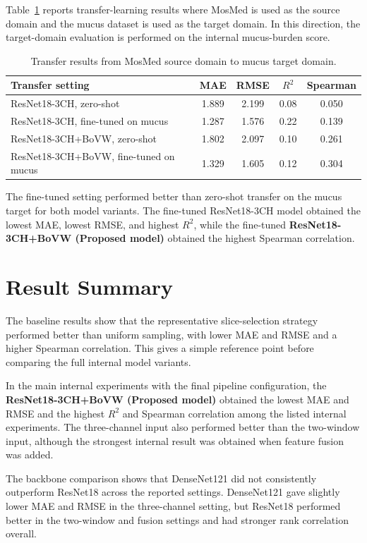 Table~\ref{tab:transfer_mucus_target} reports transfer-learning results where MosMed is used as the source domain and the mucus dataset is used as the target domain. In this direction, the target-domain evaluation is performed on the internal mucus-burden score.

\begin{table}[H]
\centering
\caption{Transfer results from MosMed source domain to mucus target domain.}
\label{tab:transfer_mucus_target}
\begin{tabular}{lcccc}
\toprule
Transfer setting & MAE & RMSE & \(R^2\) & Spearman \\
\midrule
ResNet18-3CH, zero-shot & 1.889 & 2.199 & 0.08 & 0.050 \\
ResNet18-3CH, fine-tuned on mucus & 1.287 & 1.576 & 0.22 & 0.139 \\
ResNet18-3CH+BoVW, zero-shot & 1.802 & 2.097 & 0.10 & 0.261 \\
ResNet18-3CH+BoVW, fine-tuned on mucus & 1.329 & 1.605 & 0.12 & 0.304 \\
\bottomrule
\end{tabular}
\end{table}

The fine-tuned setting performed better than zero-shot transfer on the mucus target for both model variants. The fine-tuned ResNet18-3CH model obtained the lowest MAE, lowest RMSE, and highest \(R^2\), while the fine-tuned \textbf{ResNet18-3CH+BoVW (Proposed model)} obtained the highest Spearman correlation.


\section{Result Summary}
\label{sec:result_summary}
The baseline results show that the representative slice-selection strategy performed better than uniform sampling, with lower MAE and RMSE and a higher Spearman correlation. This gives a simple reference point before comparing the full internal model variants.

In the main internal experiments with the final pipeline configuration, the \textbf{ResNet18-3CH+BoVW (Proposed model)} obtained the lowest MAE and RMSE and the highest \(R^2\) and Spearman correlation among the listed internal experiments. The three-channel input also performed better than the two-window input, although the strongest internal result was obtained when feature fusion was added.

The backbone comparison shows that DenseNet121 did not consistently outperform ResNet18 across the reported settings. DenseNet121 gave slightly lower MAE and RMSE in the three-channel setting, but ResNet18 performed better in the two-window and fusion settings and had stronger rank correlation overall.

